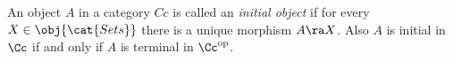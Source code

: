 \begin{defin*}
  An object $A$ in a category $Cc$ is called an \emph{initial object} if for every
  $X\in\obj{\cat{Sets}}$ there is a unique morphism $A\ra X$. Also $A$ is initial in $\Cc$
  if and only if $A$ is terminal in $\Cc^{\text{op}}$.
\end{defin*}
